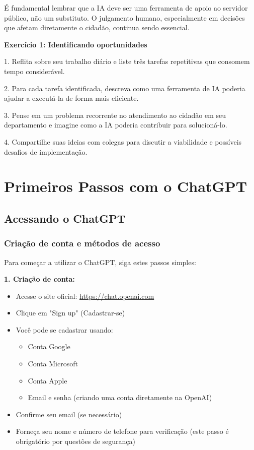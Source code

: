 \documentclass[12pt,a4paper]{book}
\begin{document}
\begin{tcolorbox}[atencao]
É fundamental lembrar que a IA deve ser uma ferramenta de apoio ao servidor público, não um substituto. O julgamento humano, especialmente em decisões que afetam diretamente o cidadão, continua sendo essencial.
\end{tcolorbox}

\begin{tcolorbox}[pratica]
\textbf{Exercício 1: Identificando oportunidades}

1. Reflita sobre seu trabalho diário e liste três tarefas repetitivas que consomem tempo considerável.

2. Para cada tarefa identificada, descreva como uma ferramenta de IA poderia ajudar a executá-la de forma mais eficiente.

3. Pense em um problema recorrente no atendimento ao cidadão em seu departamento e imagine como a IA poderia contribuir para solucioná-lo.

4. Compartilhe suas ideias com colegas para discutir a viabilidade e possíveis desafios de implementação.
\end{tcolorbox}

\chapter{Primeiros Passos com o ChatGPT}

\section{Acessando o ChatGPT}

\subsection{Criação de conta e métodos de acesso}

Para começar a utilizar o ChatGPT, siga estes passos simples:

\textbf{1. Criação de conta:}
\begin{itemize}
    \item Acesse o site oficial: \url{https://chat.openai.com}
    \item Clique em "Sign up" (Cadastrar-se)
    \item Você pode se cadastrar usando:
    \begin{itemize}
        \item Conta Google
        \item Conta Microsoft
        \item Conta Apple
        \item Email e senha (criando uma conta diretamente na OpenAI)
    \end{itemize}
    \item Confirme seu email (se necessário)
    \item Forneça seu nome e número de telefone para verificação (este passo é obrigatório por questões de segurança)
\end{itemize}
\end{document}

